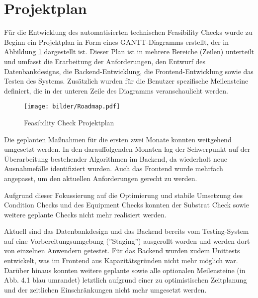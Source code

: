 \section{Projektplan}
Für die Entwicklung des automatisierten technischen Feasibility Checks wurde zu Beginn ein Projektplan in Form eines GANTT-Diagramms erstellt, der in Abbildung \ref{fig:roadmap} dargestellt ist. Dieser Plan ist in mehrere Bereiche (Zeilen) unterteilt und umfasst die Erarbeitung der Anforderungen, den Entwurf des Datenbankdesigns, die Backend-Entwicklung, die Frontend-Entwicklung sowie das Testen des Systems. Zusätzlich wurden für die Benutzer spezifische Meilensteine definiert, die in der unteren Zeile des Diagramms veranschaulicht werden.

\begin{figure}[!htbp]
    \centering
    \texttt{[image: bilder/Roadmap.pdf]}
    \caption{Feasibility Check Projektplan}
    \label{fig:roadmap}
\end{figure}

Die geplanten Maßnahmen für die ersten zwei Monate konnten weitgehend umgesetzt werden. In den darauffolgenden Monaten lag der Schwerpunkt auf der Überarbeitung bestehender Algorithmen im Backend, da wiederholt neue Ausnahmefälle identifiziert wurden. Auch das Frontend wurde mehrfach angepasst, um den aktuellen Anforderungen gerecht zu werden.

Aufgrund dieser Fokussierung auf die Optimierung und stabile Umsetzung des Condition Checks und des Equipment Checks konnten der Substrat Check sowie weitere geplante Checks nicht mehr realisiert werden. 

Aktuell sind das Datenbankdesign und das Backend bereits vom Testing-System auf eine Vorbereitungsumgebung (''Staging'') ausgerollt worden und werden dort von einzelnen Anwendern getestet. Für das Backend wurden zudem Unittests entwickelt, was im Frontend aus Kapazitätsgründen nicht mehr möglich war. Darüber hinaus konnten weitere geplante sowie alle optionalen Meilensteine (in Abb. 4.1 blau umrandet) letztlich aufgrund einer zu optimistischen Zeitplanung und der zeitlichen Einschränkungen nicht mehr umgesetzt werden.